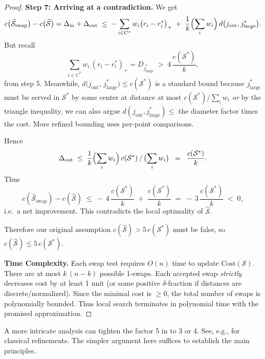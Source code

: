 \begin{proof}
\medskip
\noindent
\textbf{Step 7: Arriving at a contradiction.}
We get
\[
  c\bigl(\widehat{\mathcal{S}}_{\mathrm{swap}}\bigr)
  -
  c\bigl(\widehat{\mathcal{S}}\bigr)
  =
  \Delta_{\mathrm{in}} + \Delta_{\mathrm{out}}
  \;\le\;
  -\sum_{i\in C^*}
     w_i
     \bigl(r_i - r_i^*\bigr)_{+}
  \;+\;
  \frac{1}{k}
  \Bigl(\sum_{i} w_i\Bigr)
  \,
  d\bigl(j_{\mathrm{out}},j^*_{\text{large}}\bigr).
\]
But recall
\[
  \sum_{i\in C^*} 
   w_i\,
   (r_i - r_i^*)_{+}
   =
   D_{j^*_{\text{large}}}
   \;>\;
   4\,\frac{c(\mathcal{S}^*)}{k},
\]
from step 5.  Meanwhile, $d\bigl(j_{\mathrm{out}},\,j^*_{\text{large}}\bigr)\le c(\mathcal{S}^*)$ is a standard bound because $j^*_{\text{large}}$ must be served in $\mathcal{S}^*$ by some center at distance at most $c(\mathcal{S}^*) / \sum_i w_i$ \emph{or} by the triangle inequality, we can also argue $d(j_{\mathrm{out}},j^*_{\text{large}})\le$ the diameter factor times the cost.  More refined bounding uses per-point comparisons.

Hence
\[
  \Delta_{\mathrm{out}}
  \;\le\;
  \frac{1}{k}
  \Bigl(\sum_{i} w_i\Bigr)
  \,c(\mathcal{S}^*)
  \,/\,\bigl(\sum_{i} w_i\bigr)
  \;\;=\;\;
  \frac{c(\mathcal{S}^*)}{k}.
\]
Thus
\[
  c(\widehat{\mathcal{S}}_{\mathrm{swap}})
  -
  c(\widehat{\mathcal{S}})
  \;\le\;
  -\,4\,\frac{c(\mathcal{S}^*)}{k}
  \;+\;
  \frac{c(\mathcal{S}^*)}{k}
  \;=\;
  -\,3\,\frac{c(\mathcal{S}^*)}{k}
  \;<\;0,
\]
i.e.\ a net improvement.  This contradicts the local optimality of $\widehat{\mathcal{S}}$.  

Therefore our original assumption $c(\widehat{\mathcal{S}})>5\,c(\mathcal{S}^*)$ must be false, so $c(\widehat{\mathcal{S}})\le 5\,c(\mathcal{S}^*)$.  

\medskip
\noindent
\textbf{Time Complexity.}
Each swap test requires $O(n)$ time to update $\mathrm{Cost}(\mathcal{S})$.  There are at most $k\,(n-k)$ possible 1-swaps.  Each accepted swap \emph{strictly} decreases cost by at least 1 unit (or some positive $\delta$-fraction if distances are discrete/normalized).  Since the minimal cost is $\ge0$, the total number of swaps is polynomially bounded.  Thus local search terminates in polynomial time with the promised approximation.

\end{proof}

\begin{remark}
A more intricate analysis can tighten the factor 5 in  to 3 or 4.  See, e.g., \citep{gupta2008simpler,arya2001local} for classical refinements.  The simpler argument here suffices to establish the main principles.
\end{remark}

